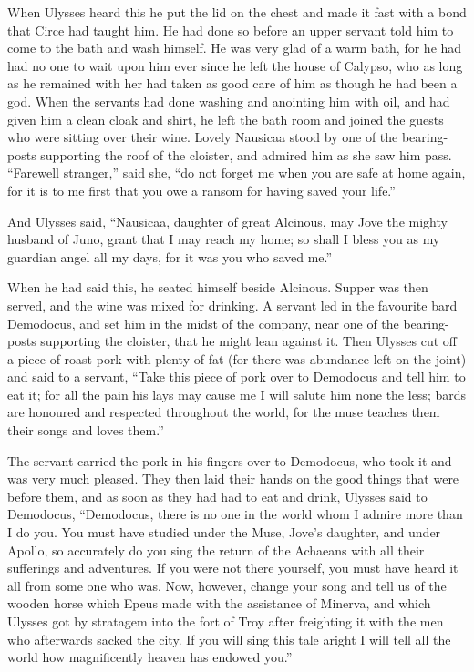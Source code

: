 When Ulysses heard this he put the lid on the chest and made it fast with a
bond that Circe had taught him. He had done so before an upper servant told him
to come to the bath and wash himself. He was very glad of a warm bath, for he
had had no one to wait upon him ever since he left the house of Calypso, who as
long as he remained with her had taken as good care of him as though he had
been a god. When the servants had done washing and anointing him with oil, and
had given him a clean cloak and shirt, he left the bath room and joined the
guests who were sitting over their wine. Lovely Nausicaa stood by one of the
bearing-posts supporting the roof of the cloister, and admired him as she saw
him pass. “Farewell stranger,” said she, “do not forget me when you are safe at
home again, for it is to me first that you owe a ransom for having saved your
life.”

And Ulysses said, “Nausicaa, daughter of great Alcinous, may Jove the mighty
husband of Juno, grant that I may reach my home; so shall I bless you as my
guardian angel all my days, for it was you who saved me.”

When he had said this, he seated himself beside Alcinous. Supper was then
served, and the wine was mixed for drinking. A servant led in the favourite
bard Demodocus, and set him in the midst of the company, near one of the
bearing-posts supporting the cloister, that he might lean against it. Then
Ulysses cut off a piece of roast pork with plenty of fat (for there was
abundance left on the joint) and said to a servant, “Take this piece of pork
over to Demodocus and tell him to eat it; for all the pain his lays may cause
me I will salute him none the less; bards are honoured and respected throughout
the world, for the muse teaches them their songs and loves them.”

The servant carried the pork in his fingers over to Demodocus, who took it and
was very much pleased. They then laid their hands on the good things that were
before them, and as soon as they had had to eat and drink, Ulysses said to
Demodocus, “Demodocus, there is no one in the world whom I admire more than I
do you. You must have studied under the Muse, Jove’s daughter, and under
Apollo, so accurately do you sing the return of the Achaeans with all their
sufferings and adventures. If you were not there yourself, you must have heard
it all from some one who was. Now, however, change your song and tell us of the
wooden horse which Epeus made with the assistance of Minerva, and which Ulysses
got by stratagem into the fort of Troy after freighting it with the men who
afterwards sacked the city. If you will sing this tale aright I will tell all
the world how magnificently heaven has endowed you.”

